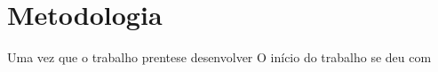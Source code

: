 \chapter{Metodologia}\label{chap:metodologia}


Uma vez que o trabalho prentese desenvolver O início do trabalho se deu com 
